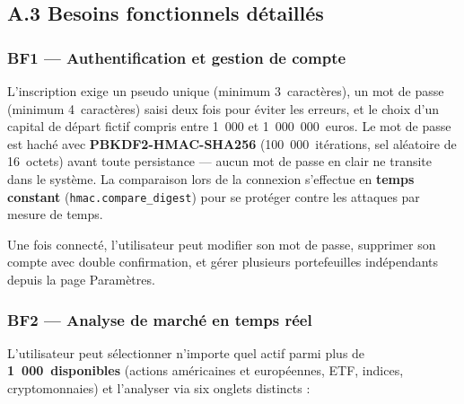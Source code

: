 \documentclass[a4paper, 12pt, twoside]{article}
\begin{document}
    \subsection*{A.3 Besoins fonctionnels détaillés}

    \subsubsection*{BF1 --- Authentification et gestion de compte}

    L'inscription exige un pseudo unique (minimum 3~caractères), un mot de
    passe (minimum 4~caractères) saisi deux fois pour éviter les erreurs, et
    le choix d'un capital de départ fictif compris entre 1~000 et
    1~000~000~euros. Le mot de passe est haché avec
    \textbf{PBKDF2-HMAC-SHA256} (100~000~itérations, sel aléatoire de
    16~octets) avant toute persistance --- aucun mot de passe en clair ne
    transite dans le système. La comparaison lors de la connexion s'effectue
    en \textbf{temps constant} (\texttt{hmac.compare\_digest}) pour se
    protéger contre les attaques par mesure de temps.

    Une fois connecté, l'utilisateur peut modifier son mot de passe,
    supprimer son compte avec double confirmation, et gérer plusieurs
    portefeuilles indépendants depuis la page Paramètres.

    \subsubsection*{BF2 --- Analyse de marché en temps réel}

    L'utilisateur peut sélectionner n'importe quel actif parmi plus de
    \textbf{1~000~disponibles} (actions américaines et européennes, ETF,
    indices, cryptomonnaies) et l'analyser via six onglets distincts :
\end{document}

